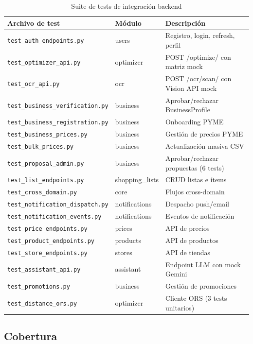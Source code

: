 \begin{table}[h]
\caption{Suite de tests de integraci\'on backend}
\label{tab:tests-integracion}
\centering
\begin{tabular}{|l|l|l|}
\hline
\textbf{Archivo de test} & \textbf{M\'odulo} & \textbf{Descripci\'on} \\
\hline
\texttt{test\_auth\_endpoints.py} & users & Registro, login, refresh, perfil \\
\texttt{test\_optimizer\_api.py} & optimizer & POST /optimize/ con matriz mock \\
\texttt{test\_ocr\_api.py} & ocr & POST /ocr/scan/ con Vision API mock \\
\texttt{test\_business\_verification.py} & business & Aprobar/rechazar BusinessProfile \\
\texttt{test\_business\_registration.py} & business & Onboarding PYME \\
\texttt{test\_business\_prices.py} & business & Gesti\'on de precios PYME \\
\texttt{test\_bulk\_prices.py} & business & Actualizaci\'on masiva CSV \\
\texttt{test\_proposal\_admin.py} & business & Aprobar/rechazar propuestas (6 tests) \\
\texttt{test\_list\_endpoints.py} & shopping\_lists & CRUD listas e \'items \\
\texttt{test\_cross\_domain.py} & core & Flujos cross-domain \\
\texttt{test\_notification\_dispatch.py} & notifications & Despacho push/email \\
\texttt{test\_notification\_events.py} & notifications & Eventos de notificaci\'on \\
\texttt{test\_price\_endpoints.py} & prices & API de precios \\
\texttt{test\_product\_endpoints.py} & products & API de productos \\
\texttt{test\_store\_endpoints.py} & stores & API de tiendas \\
\texttt{test\_assistant\_api.py} & assistant & Endpoint LLM con mock Gemini \\
\texttt{test\_promotions.py} & business & Gesti\'on de promociones \\
\texttt{test\_distance\_ors.py} & optimizer & Cliente ORS (3 tests unitarios) \\
\hline
\end{tabular}
\end{table}

\subsection{Cobertura}\label{subsec:cobertura}

